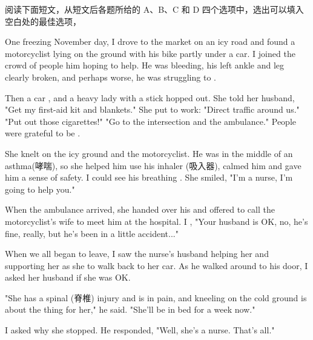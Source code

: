 \documentclass{英语试卷}
\begin{document}
\par 阅读下面短文，从短文后各题所给的 A、B、C 和 D 四个选项中，选出可以填入空白处的最佳选项，\par
\par One freezing November day, I drove to the market on an icy road and found a motorcyclist lying on the ground with his bike partly under a car. I joined the crowd of people  him hoping to help. He was bleeding, his left ankle and leg clearly broken, and perhaps worse, he was struggling to .\par
\par Then a car , and a heavy lady with a stick hopped out. She told her husband, "Get my first-aid kit and blankets." She put  to work: "Direct traffic around us." "Put out those cigarettes!" "Go to the intersection and  the ambulance." People were grateful to be .\par
\par She knelt on the icy ground and  the motorcyclist. He was in the middle of an asthma(哮喘), so she helped him use his inhaler (吸入器), calmed him and gave him a sense of safety. I could see his breathing . She smiled, "I'm a nurse, I'm going to help you."\par
\par When the ambulance arrived, she handed over his  and offered to call the motorcyclist's wife to meet him at the hospital. I , "Your husband is OK, no, he's fine, really, but he's been in a little accident..."\par
\par When we all began to leave, I saw the nurse's husband helping her  and supporting her as she  to walk back to her car. As he walked around to his door, I asked her husband if she was OK.\par
\par "She has a spinal (脊椎) injury and is in  pain, and kneeling on the cold ground is about the  thing for her," he said. "She’ll be in bed for a week now."\par
\par I asked why she stopped. He responded, "Well, she's a nurse. That's all."\par
{}
\end{document}
